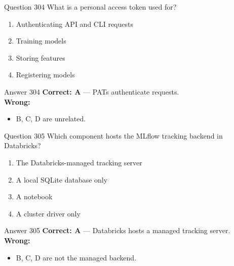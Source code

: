\documentclass[aspectratio=169,11pt]{beamer}
\begin{document}
	\begin{frame}{Question 304}
		What is a personal access token used for?
		\begin{enumerate}[label=\Alph*.]
			\item Authenticating API and CLI requests
			\item Training models
			\item Storing features
			\item Registering models
		\end{enumerate}
	\end{frame}
	\begin{frame}{Answer 304}
		\textbf{Correct: A} --- PATs authenticate requests.\\
		\vspace{0.5em}
		\textbf{Wrong:}
		\begin{itemize}
			\item B, C, D are unrelated.
		\end{itemize}
	\end{frame}
	
	\begin{frame}{Question 305}
		Which component hosts the MLflow tracking backend in Databricks?
		\begin{enumerate}[label=\Alph*.]
			\item The Databricks-managed tracking server
			\item A local SQLite database only
			\item A notebook
			\item A cluster driver only
		\end{enumerate}
	\end{frame}
	\begin{frame}{Answer 305}
		\textbf{Correct: A} --- Databricks hosts a managed tracking server.\\
		\vspace{0.5em}
		\textbf{Wrong:}
		\begin{itemize}
			\item B, C, D are not the managed backend.
		\end{itemize}
	\end{frame}
	
\end{document}
